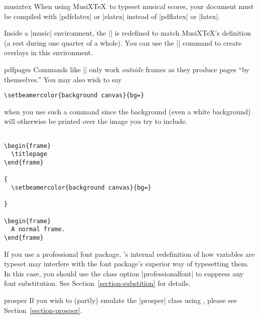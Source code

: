 \begin{package}{{musixtex}}
  When using MusiX\TeX\ to typeset musical scores, your document must be compiled with |pdfelatex| or |elatex| instead of |pdflatex| or |latex|.

  Inside a |music| environment, the |\pause| is redefined to match MusiX\TeX's definition (a rest during one quarter of a whole). You can use the |\beamerpause| command to create overlays in this environment.
\end{package}

\begin{package}{{pdfpages}}
  Commands like || only work \emph{outside} frames as they produce pages ``by themselves.'' You may also wish to say

\begin{verbatim}
\setbeamercolor{background canvas}{bg=}
\end{verbatim}

  when you use such a command since the background (even a white background) will otherwise be printed over the image you try to include.

  \example
\begin{verbatim}

\begin{frame}
  \titlepage
\end{frame}

{
  \setbeamercolor{background canvas}{bg=}
  
}

\begin{frame}
  A normal frame.
\end{frame}

\end{verbatim}
\end{package}

\begin{package}{{\normalfont{}}}
  \beamernote
  If you use a professional font package, \beamer's internal redefinition of how variables are typeset may interfere with the font package's superior way of typesetting them. In this case, you should use the class option |professionalfont| to suppress any font substitution. See Section~\ref{section-substition} for details.
\end{package}

\begin{class}{{prosper}}
  If you wish to (partly) emulate the |prosper| class using \beamer, please see Section~\ref{section-prosper}.
\end{class}


